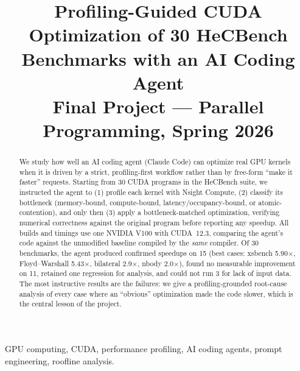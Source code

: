 \documentclass[conference]{IEEEtran}
\begin{document}
\title{Profiling-Guided CUDA Optimization of 30 HeCBench
Benchmarks with an AI Coding Agent\\
{\footnotesize Final Project --- Parallel Programming, Spring 2026}}

\author{%
%
}

\maketitle

\begin{abstract}
We study how well an AI coding agent (Claude Code) can optimize real GPU kernels
when it is driven by a strict, profiling-first workflow rather than by free-form
``make it faster'' requests. Starting from 30 CUDA programs in the HeCBench
suite, we instructed the agent to (1) profile each kernel with Nsight Compute,
(2) classify its bottleneck (memory-bound, compute-bound, latency/occupancy-bound,
or atomic-contention), and only then (3) apply a bottleneck-matched optimization,
verifying numerical correctness against the original program before reporting any
speedup. All builds and timings use one NVIDIA V100 with CUDA~12.3, comparing the
agent's code against the unmodified baseline compiled by the \emph{same} compiler.
Of 30 benchmarks, the agent produced confirmed speedups on 15 (best cases:
xsbench 5.90$\times$, Floyd--Warshall 5.43$\times$, bilateral 2.9$\times$,
nbody 2.0$\times$), found no measurable improvement on 11, retained one regression
for analysis, and could not run 3 for lack of input data. The most instructive
results are the failures: we give a
profiling-grounded root-cause analysis of every case where an ``obvious''
optimization made the code slower, which is the central lesson of the project.
\end{abstract}

\begin{IEEEkeywords}
GPU computing, CUDA, performance profiling, AI coding agents, prompt engineering,
roofline analysis.
\end{IEEEkeywords}
\end{document}
